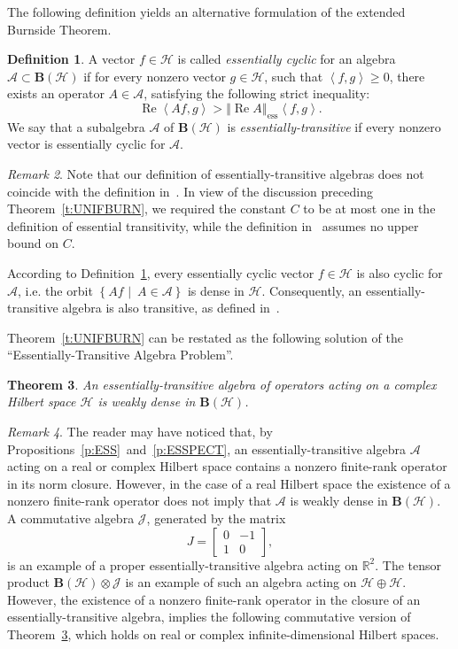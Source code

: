 \documentclass{tran-l}
\newtheorem{thm}{Theorem}[subsection]
\theoremstyle{definition}
\newtheorem{defn}[thm]{Definition}
\theoremstyle{remark}
\newtheorem{rem}[thm]{Remark}
\numberwithin{equation}{subsection}
\DeclareMathOperator{\RE}{Re}
\DeclareMathOperator{\ess}{ess}
\newcommand{\h}{\mathcal{H}}
\newcommand{\A}{\mathcal{A}}
\newcommand{\J}{\mathcal{J}}
\newcommand{\BH}{\mathbf{B}(\mathcal{H})}
\newcommand{\Real}{\mathbb{R}}
\newcommand{\set}[1]{\left\{#1\right\}}
\newcommand{\seq}[1]{\left<#1\right>}
\newcommand{\norm}[1]{\left\Vert#1\right\Vert}
\newcommand{\essnorm}[1]{\norm{#1}_{\ess}}
\begin{document}
The following definition yields an alternative formulation of the extended Burnside Theorem.

\begin{defn}\label{d:ESSTRANS}
A vector $f\in\h$ is called \emph{essentially cyclic} for an algebra $\A\subset\BH$ if for every nonzero vector $g\in\h$, such that $\seq{f,g}\geq0$, there exists an operator $A\in\A$, satisfying the following strict inequality:
\[  \RE{\seq{A{f},g}} > \essnorm{\RE{A}} \seq{f,g}. \]
We say that a subalgebra $\A$ of $\BH$ is \emph{essentially-transitive} if every nonzero vector is essentially cyclic for $\A$.
\end{defn}

\begin{rem}
Note that our definition of essentially-transitive algebras does not coincide with the definition in~\cite{Lom91}. In view of the discussion preceding Theorem~\ref{t:UNIFBURN}, we required the constant $C$ to be at most one in the definition of essential transitivity, while the definition in~\cite{Lom91} assumes no upper bound on $C$.

According to Definition~\ref{d:ESSTRANS}, every essentially cyclic vector $f\in\h$ is also cyclic for $\A$, i.e. the orbit $\set{A{f}\,\,|\,\,\,A\in\A}$ is dense in $\h$. Consequently, an essentially-transitive algebra is also transitive, as defined in~\cite{RR73}.
\end{rem}

Theorem~\ref{t:UNIFBURN} can be restated as the following solution of the ``Essentially-Transitive Algebra Problem''.

\begin{thm}\label{t:ESSBURN}
An essentially-transitive algebra of operators acting on a complex Hilbert space $\h$ is weakly dense in $\BH$.
\end{thm}

\begin{rem}
The reader may have noticed that, by Propositions~\ref{p:ESS}~and~\ref{p:ESSPECT}, an essentially-transitive algebra $\A$ acting on a real or complex Hilbert space contains a nonzero finite-rank operator in its norm closure. However, in the case of a real Hilbert space the existence of a nonzero finite-rank operator does not imply that $\A$ is weakly dense in $\BH$. A commutative algebra $\J$, generated by the matrix
\[ J= \left[
         \begin{array}{rr}
              0 & -1 \\
              1 &  0
          \end{array} \right], \]
is an example of a proper essentially-transitive algebra acting on $\Real^2$. The tensor product $\BH\otimes\J$ is an example of such an algebra acting on $\h\oplus\h$. However, the existence of a nonzero finite-rank operator in the closure of an essentially-transitive algebra, implies the following commutative version of Theorem~\ref{t:ESSBURN}, which holds on real or complex infinite-dimensional Hilbert spaces.
\end{rem}
\end{document}
